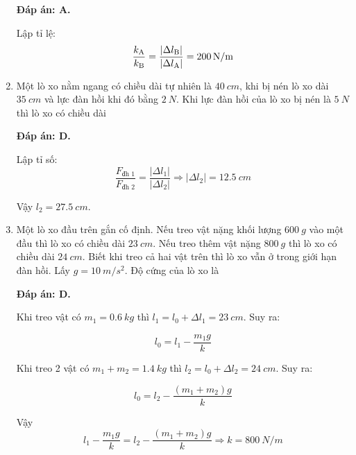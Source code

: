 \begin{enumerate}[label=\bfseries Câu \arabic*:]
	\loigiai
	{	\textbf{Đáp án: A.}
		
	Lập tỉ lệ:
	$$\dfrac{k_\text A}{k_\text B} = \dfrac{|\Delta l_\text B|}{|\Delta l_\text A|} = \SI{200}{N/m}$$
	}
	
	\item {}
	
	\cauhoi
	{Một lò xo nằm ngang có chiều dài tự nhiên là $\SI{40}{cm}$, khi bị nén lò xo dài $\SI{35}{cm}$ và lực đàn hồi khi đó bằng $\SI{2}{N}$. Khi lực đàn hồi của lò xo bị nén là $\SI{5}{N}$ thì lò xo có chiều dài
	}
	
	\loigiai
	{	\textbf{Đáp án: D.}	
		
		Lập tỉ số:
		$$\dfrac{F_\text{đh 1}}{F_\text{đh 2}} = \dfrac{|\Delta l_1|}{|\Delta l_2|} \Rightarrow |\Delta l_2| = \SI{12.5}{cm}$$
		
		Vậy $l_2 = \SI{27.5}{cm}$.
	}
	
	\item {}
	
	\cauhoi
	{Một lò xo đầu trên gắn cố định. Nếu treo vật nặng khối lượng $\SI{600}{g}$ vào một đầu thì lò xo có chiều dài $\SI{23}{cm}$. Nếu treo thêm vật nặng $\SI{800}{g}$ thì lò xo có chiều dài $\SI{24}{cm}$. Biết khi treo cả hai vật trên thì lò xo vẫn ở trong giới hạn đàn hồi. Lấy $g=\SI{10}{m/s^2}$. Độ cứng của lò xo là
	}
	
	\loigiai
	{	\textbf{Đáp án: D.}
		
	Khi treo vật có $m_1=\SI{0.6}{kg}$ thì $l_1 = l_0 + \Delta l_1 = \SI{23}{cm}$. Suy ra:
	
	$$l_0 = l_1 - \dfrac{m_1 g}{k}$$
	
	Khi treo 2 vật có $m_1+m_2 = \SI{1.4}{kg}$ thì $l_2 = l_0 + \Delta l_2 = \SI{24}{cm}$. Suy ra:
	
	$$l_0 = l_2 - \dfrac{(m_1+m_2)g}{k}$$
	
	Vậy $$l_1 - \dfrac{m_1 g}{k} =l_2 - \dfrac{(m_1+m_2)g}{k} \Rightarrow k = \SI{800}{N/m} $$
	
	
	}
	
	
\end{enumerate}


